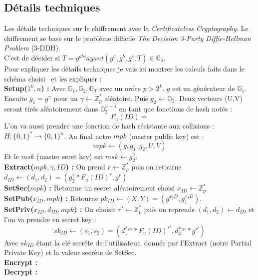 \subsection{Détails techniques}
Les détails techniques sur le chiffrement avec la \textit{Certificateless Cryptography}.
Le chiffrement se base sur le problème difficile \textit{The Decision 3-Party Diffie-Hellman Problem} (3-DDH). \\C'est de décider si $T =g^{abc} ayant (g^a, g^b, g^c, T) \in \mathbb{G}_4$.\\
Pour expliquer les détails techniques je vais ici montrer les calculs faits dans le schéma choisi~\cite{DBLP:conf/pkc/DentLP08} et les expliquer :\\
\textbf{Setup($1^k, n$) :} Avec $\mathbb{G}_1, \mathbb{G}_2, \mathbb{G}_T$ avec un ordre $p > 2^k$. $g$ est un générateur de $\mathbb{G}_1$. Ensuite  $g_1 = g^\gamma$ pour un $\gamma \leftarrow  \mathbb{Z}_p^*$ aléatoire. Puis $g_2 \leftarrow \mathbb{G}_2$. Deux vecteurs (U,V) seront tirés aléatoirement dans $\mathbb{G}_2^{n+1}$ en tant que fonctions de hash notés :
\[F_u(ID) = \]
L'on va aussi prendre une fonction de hash résistante aux collisions : $H : \{0,1\}^* \rightarrow \{0,1\}^n$. Au final notre $mpk$ (master public key) est :
\[mpk \leftarrow (g, g_1, g_2, U, V)\]
Et le $msk$ (master seret key) est $msk \leftarrow g_2^\gamma$.
\\
\textbf{Extract($mpk, \gamma, ID$) :} On prend $r \leftarrow \mathbb{Z}_p^*$ puis on retourne $d_{ID} \leftarrow (d_1, d_2) = (g_2^\gamma * F_u(ID)^r, g^r)$\\
\textbf{SetSec($mpk$) :} Retourne un secret aléatoirement choisi $x_{ID} \leftarrow \mathbb{Z}_p^*$.\\
\textbf{SetPub($x_{ID}, mpk$) :} Retourne $pk_{ID} \leftarrow (X,Y) = (g^{x_ID}, g_1^{x_ID})$.\\
\textbf{SetPriv($x_{ID}, d_{ID}, mpk$) :} On choisit $r' \leftarrow \mathbb{Z}_p^*$ puis on reprends $(d_1, d_2) \leftarrow d_{ID}$ et l'on va prendre en secret key : 
\[sk_{ID} \leftarrow (s_1, s_2) = (d_1^{x_{ID}} * F_u(ID)^{r'}, d_2^{x_{ID}} * g^{r'})\]
Avec $sk_{ID}$ étant la clé secréte de l'utilisateur, donnée par l'Extract (notre Partial Private Key) et la valeur secrète de SetSec.\\
\textbf{Encrypt :}\\
\textbf{Decrypt :}
